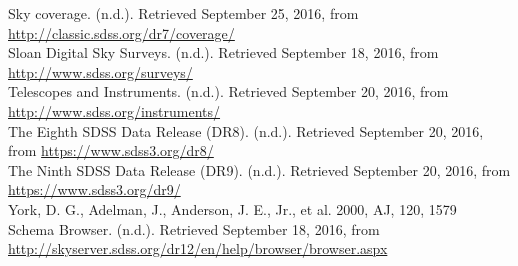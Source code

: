 \documentclass[10pt,letterpaper]{article}
\begin{document}
\begin{thebibliography}{1}
 Sky coverage. (n.d.). Retrieved September 25, 2016, from \url{http://classic.sdss.org/dr7/coverage/}\\

 Sloan Digital Sky Surveys. (n.d.). Retrieved September 18, 2016, from \url{http://www.sdss.org/surveys/}\\

 Telescopes and Instruments. (n.d.). Retrieved September 20, 2016, from \url{http://www.sdss.org/instruments/}\\

 The Eighth SDSS Data Release (DR8). (n.d.). Retrieved September 20, 2016, from \url{https://www.sdss3.org/dr8/}\\

 The Ninth SDSS Data Release (DR9). (n.d.). Retrieved September 20, 2016, from \url{https://www.sdss3.org/dr9/}\\

 York, D. G., Adelman, J., Anderson, J. E., Jr., et al. 2000, AJ, 120, 1579\\

 Schema Browser. (n.d.). Retrieved September 18, 2016, from \url{http://skyserver.sdss.org/dr12/en/help/browser/browser.aspx}\\

\end{thebibliography}
\end{document}
